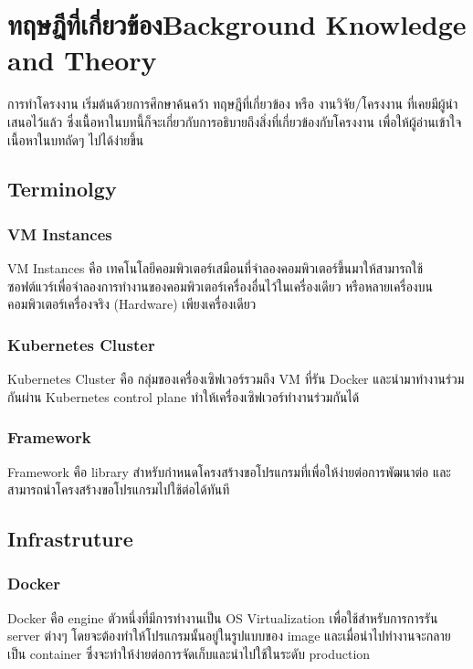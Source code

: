 \chapter{\ifcpe ทฤษฎีที่เกี่ยวข้อง\else Background Knowledge and Theory\fi}

การทำโครงงาน เริ่มต้นด้วยการศึกษาค้นคว้า ทฤษฎีที่เกี่ยวข้อง หรือ งานวิจัย/โครงงาน ที่เคยมีผู้นำเสนอไว้แล้ว ซึ่งเนื้อหาในบทนี้ก็จะเกี่ยวกับการอธิบายถึงสิ่งที่เกี่ยวข้องกับโครงงาน เพื่อให้ผู้อ่านเข้าใจเนื้อหาในบทถัดๆ ไปได้ง่ายขึ้น

\section{Terminolgy}

\subsection{VM Instances}

VM Instances \cite{vm} คือ เทคโนโลยีคอมพิวเตอร์เสมือนที่จำลองคอมพิวเตอร์ขึ้นมาให้สามารถใช้ซอฟต์แวร์เพื่อจำลองการทำงานของคอมพิวเตอร์เครื่องอื่นไว้ในเครื่องเดียว หรือหลายเครื่องบนคอมพิวเตอร์เครื่องจริง (Hardware) เพียงเครื่องเดียว

\subsection{Kubernetes Cluster}

Kubernetes Cluster คือ กลุ่มของเครื่องเซิฟเวอร์รวมถึง VM \cite{vm} ที่รัน Docker และนำมาทำงานร่วมกันผ่าน Kubernetes control plane \cite{kubecomp} ทำให้เครื่องเซิฟเวอร์ทำงานร่วมกันได้

\subsection{Framework}

Framework \cite{framework} คือ library สำหรับกำหนดโครงสร้างขอโปรแกรมที่เพื่อให้ง่ายต่อการพัฒนาต่อ และสามารถนำโครงสร้างขอโปรแกรมไปใช้ต่อได้ทันที

\section{Infrastruture}

\subsection{Docker}

Docker \cite{docker} คือ engine ตัวหนึ่งที่มีการทำงานเป็น OS Virtualization \cite {osvirtual} เพื่อใช้สำหรับการการรัน server ต่างๆ โดยจะต้องทำให้โปรแกรมนั้นอยู่ในรูปแบบของ image และเมื่อนำไปทำงานจะกลายเป็น container ซึ่งจะทำให้ง่ายต่อการจัดเก็บและนำไปใช้ในระดับ production

